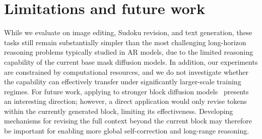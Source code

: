 \section{Limitations and future work}
\label{sec:limitations}

While we evaluate \method on image editing, Sudoku revision, and text generation, these tasks still remain substantially simpler than the most challenging long-horizon reasoning problems typically studied in AR models, due to the limited reasoning capability of the current base mask diffusion models. In addition, our experiments are constrained by computational resources, and we do not investigate whether the \method capability can effectively transfer under significantly larger-scale training regimes. For future work, applying \method to stronger block diffusion models~\citep{arriola2025block,cheng2025sdar,bie2025llada2} presents an interesting direction; however, a direct application would only revise tokens within the currently generated block, limiting its effectiveness. Developing mechanisms for revising the full context beyond the current block may therefore be important for enabling more global self-correction and long-range reasoning.
